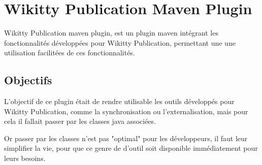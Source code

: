 

\section{Wikitty Publication Maven Plugin}

Wikitty Publication maven plugin, est un plugin maven intégrant les 
fonctionnalités développées pour Wikitty Publication, permettant une une
utilisation facilitées de ces fonctionnalités.

\subsection{Objectifs}

L'objectif de ce plugin était de rendre utilisable les outils développés pour 
Wikitty Publication, comme la synchronisation ou l'externalisation, mais 
pour cela il fallait passer par les classes java associées. 

Or passer par les classes n'est pas "optimal" pour les développeurs, il faut
leur simplifier la vie, pour que ce genre de d'outil soit disponible 
immédiatement pour leurs besoins.

